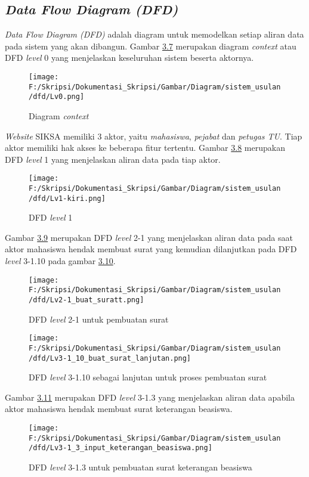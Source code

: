 \subsection{\textit{Data Flow Diagram (DFD)}}
\label{sec:data_flow_diagram}
\textit{Data Flow Diagram (DFD)} adalah diagram untuk memodelkan setiap aliran data pada sistem yang akan dibangun.
Gambar \hyperlink{data_flow}{3.7} merupakan diagram \textit{context} atau DFD \textit{level} 0 yang menjelaskan 
keseluruhan sistem beserta aktornya.

\begin{figure}[H]
	\centering
		\texttt{[image: F:/Skripsi/Dokumentasi\_Skripsi/Gambar/Diagram/sistem\_usulan/dfd/Lv0.png]}
	\caption{Diagram \textit{context}}
	\label{fig:data_flow}
\end{figure}

\textit{Website} SIKSA memiliki 3 aktor, yaitu \textit{mahasiswa}, \textit{pejabat} dan \textit{petugas TU}. Tiap aktor memiliki hak akses ke beberapa fitur tertentu. Gambar \hyperlink{level_1}{3.8} merupakan DFD \textit{level} 1 yang menjelaskan aliran data pada tiap aktor.


\begin{figure}[H]
	\centering
		\texttt{[image: F:/Skripsi/Dokumentasi\_Skripsi/Gambar/Diagram/sistem\_usulan/dfd/Lv1-kiri.png]}
	\caption{DFD \textit{level} 1}
	\label{fig:level_1}
\end{figure}

Gambar \hyperlink{level_2-1}{3.9} merupakan DFD \textit{level} 2-1 yang menjelaskan aliran data pada saat aktor mahasiswa hendak membuat surat yang kemudian dilanjutkan pada DFD \textit{level} 3-1.10 pada gambar \hyperlink{level_3-1.10}{3.10}.

\begin{figure}[H]
	\centering
		\texttt{[image: F:/Skripsi/Dokumentasi\_Skripsi/Gambar/Diagram/sistem\_usulan/dfd/Lv2-1\_buat\_suratt.png]}
	\caption{DFD \textit{level} 2-1 untuk pembuatan surat}
	\label{fig:level_2-1}
\end{figure}

\begin{figure}[H]
	\centering
		\texttt{[image: F:/Skripsi/Dokumentasi\_Skripsi/Gambar/Diagram/sistem\_usulan/dfd/Lv3-1\_10\_buat\_surat\_lanjutan.png]}
	\caption{DFD \textit{level} 3-1.10 sebagai lanjutan untuk proses pembuatan surat}
	\label{fig:level_3-1.10}
\end{figure}

Gambar \hyperlink{level_3-1.3}{3.11} merupakan DFD \textit{level} 3-1.3 yang menjelaskan aliran data apabila aktor mahasiswa hendak membuat surat keterangan beasiswa.
\begin{figure}[H]
	\centering
		\texttt{[image: F:/Skripsi/Dokumentasi\_Skripsi/Gambar/Diagram/sistem\_usulan/dfd/Lv3-1\_3\_input\_keterangan\_beasiswa.png]}
	\caption{DFD \textit{level} 3-1.3 untuk pembuatan surat keterangan beasiswa}
	\label{fig:level_3-1.3}
\end{figure}

